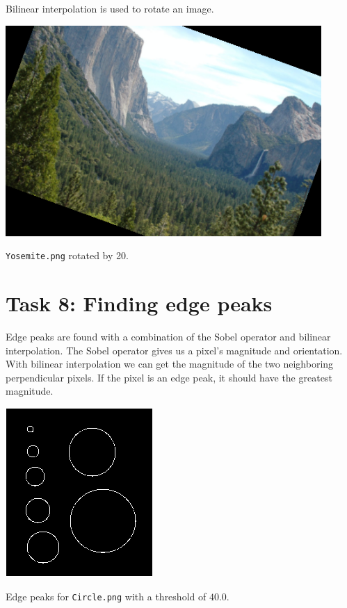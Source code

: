 \documentclass[letterpaper]{article}
\begin{document}
Bilinear interpolation is used to rotate an image.

\begin{center}
  \includegraphics[width=0.9\textwidth]{task7.png}
  
  \texttt{Yosemite.png} rotated by 20\degree.
\end{center}

\section*{Task 8: Finding edge peaks}

Edge peaks are found with a combination of the Sobel operator and bilinear
interpolation. The Sobel operator gives us a pixel's magnitude and
orientation. With bilinear interpolation we can get the magnitude of the two
neighboring perpendicular pixels. If the pixel is an edge peak, it should have
the greatest magnitude.

\begin{center}
  \includegraphics{task8.png}
  
  Edge peaks for \texttt{Circle.png} with a threshold of $40.0$.
\end{center}
\end{document}
